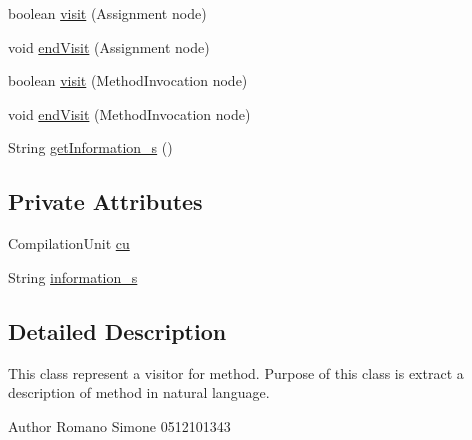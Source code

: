\begin{DoxyCompactItemize}
\item 
boolean \hyperlink{classit_1_1isislab_1_1masonhelperdocumentation_1_1visitor_1_1_code_visitor_a2b41e9c8c3315dbb1fd18e6890a3842e}{visit} (Assignment node)
\item 
void \hyperlink{classit_1_1isislab_1_1masonhelperdocumentation_1_1visitor_1_1_code_visitor_a4efdef7b2bec3dad2b29f14c0bfe62d6}{end\-Visit} (Assignment node)
\item 
boolean \hyperlink{classit_1_1isislab_1_1masonhelperdocumentation_1_1visitor_1_1_code_visitor_a217f515da74b716c9d3fb43027be8301}{visit} (Method\-Invocation node)
\item 
void \hyperlink{classit_1_1isislab_1_1masonhelperdocumentation_1_1visitor_1_1_code_visitor_a0621bb29c4a918f034a2d7a8815cba6d}{end\-Visit} (Method\-Invocation node)
\item 
String \hyperlink{classit_1_1isislab_1_1masonhelperdocumentation_1_1visitor_1_1_code_visitor_a464d8e1b4691e88a39a287c1543cbdd2}{get\-Information\-\_\-s} ()
\end{DoxyCompactItemize}
\subsection*{Private Attributes}
\begin{DoxyCompactItemize}
\item 
Compilation\-Unit \hyperlink{classit_1_1isislab_1_1masonhelperdocumentation_1_1visitor_1_1_code_visitor_af9088f73f92fd3640698ad4e660f042b}{cu}
\item 
String \hyperlink{classit_1_1isislab_1_1masonhelperdocumentation_1_1visitor_1_1_code_visitor_a8bfc263e47218ff87b62a5ad9b1294e7}{information\-\_\-s}
\end{DoxyCompactItemize}


\subsection{Detailed Description}
This class represent a visitor for method. Purpose of this class is extract a description of method in natural language. \begin{DoxyAuthor}{Author}
Romano Simone 0512101343 
\end{DoxyAuthor}


